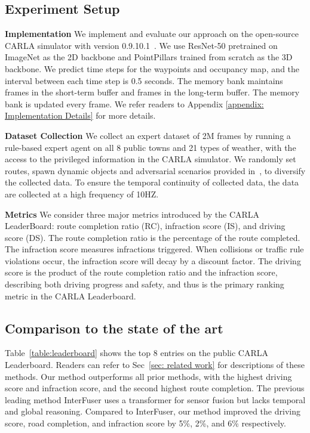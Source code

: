 \documentclass[10pt,twocolumn,letterpaper]{article}
\begin{document}
\subsection{Experiment Setup}

\noindent\textbf{Implementation}
We implement and evaluate our approach on the open-source CARLA simulator with version 0.9.10.1~\cite{dosovitskiy2017carla}. We use ResNet-50 pretrained on ImageNet as the 2D backbone and PointPillars trained from scratch as the 3D backbone. We predict  time steps for the waypoints and occupancy map, and the interval between each time step is 0.5 seconds.
The memory bank maintains  frames in the short-term buffer and  frames in the long-term buffer. 
The memory bank is updated every  frame. We refer readers to Appendix \ref{appendix: Implementation Details} for more details.

\noindent\textbf{Dataset Collection}
We collect an expert dataset of 2M frames by running a rule-based expert agent on all 8 public towns and 21 types of weather, with the access to the privileged information in the CARLA simulator. We randomly set routes, spawn dynamic objects and adversarial scenarios provided in~\cite{prakash2021multi}, to diversify the collected data. To ensure the temporal continuity of collected data, the data are collected at a high frequency of 10HZ.



\noindent\textbf{Metrics} We consider three major metrics introduced by the CARLA LeaderBoard: route completion ratio (RC), infraction score (IS), and driving score (DS). The route completion ratio is the percentage of the route completed. The infraction score measures infractions triggered. When collisions or traffic rule violations occur, the infraction score will decay by a discount factor. The driving score is the product of the route completion ratio and the infraction score, describing both driving progress and safety, and thus is the primary ranking metric in the CARLA Leaderboard.


\subsection{Comparison to the state of the art}



Table~\ref{table:leaderboard} shows the top 8 entries on the public CARLA Leaderboard. Readers can refer to Sec~\ref{sec: related work} for descriptions of these methods. Our method outperforms all prior methods, with the highest driving score and infraction score, and the second highest route completion. The previous leading method InterFuser uses a  transformer for sensor fusion but lacks temporal and global reasoning. Compared to InterFuser, our method improved the driving score, road completion, and infraction score by 5\%, 2\%, and 6\% respectively.
\end{document}
